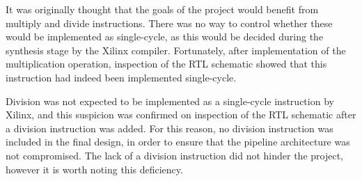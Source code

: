 It was originally thought that the goals of the project would benefit from
multiply and divide instructions. There was no way to control whether these
would be implemented as single-cycle, as this would be decided during the
synthesis stage by the Xilinx compiler. Fortunately, after implementation of the
multiplication operation, inspection of the RTL schematic showed that this
instruction had indeed been implemented single-cycle.

Division was not expected to be implemented as a single-cycle instruction by
Xilinx, and this suspicion was confirmed on inspection of the RTL schematic
after a division instruction was added. For this reason, no division instruction
was included in the final design, in order to ensure that the pipeline
architecture was not compromised. The lack of a division instruction did not
hinder the project, however it is worth noting this deficiency.
